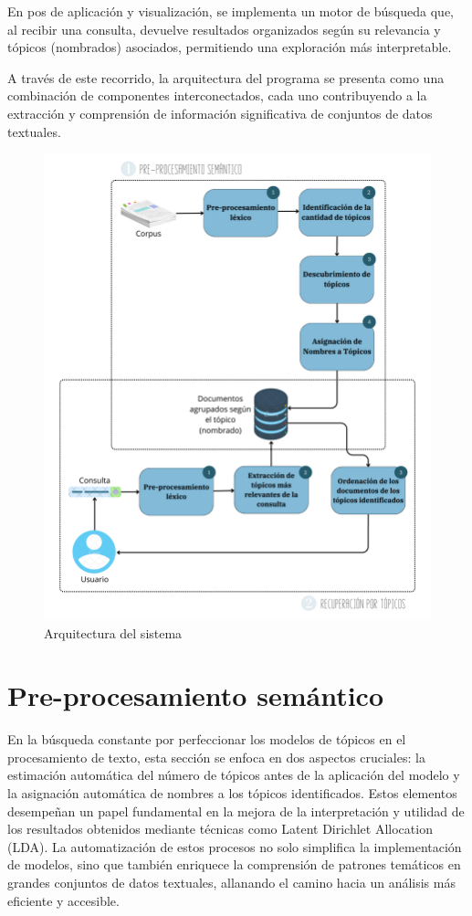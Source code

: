 En pos de aplicación y visualización, se implementa un motor de búsqueda que, al recibir una consulta, devuelve resultados organizados según su relevancia y tópicos (nombrados) asociados, permitiendo una exploración más interpretable.

A través de este recorrido, la arquitectura del programa se presenta como una combinación de componentes interconectados, cada uno contribuyendo a la extracción y comprensión de información significativa de conjuntos de datos textuales.

\begin{figure}[H]
	\centering
	\includegraphics[width=15cm]{Architecture.png}
	\caption{Arquitectura del sistema}
\end{figure}

\newpage
\section{Pre-procesamiento sem\'antico}

En la búsqueda constante por perfeccionar los modelos de tópicos en el procesamiento de texto, esta secci\'on se enfoca en dos aspectos cruciales: la estimación automática del número de tópicos antes de la aplicación del modelo y la asignación automática de nombres a los tópicos identificados. Estos elementos desempeñan un papel fundamental en la mejora de la interpretación y utilidad de los resultados obtenidos mediante técnicas como Latent Dirichlet Allocation (LDA). La automatización de estos procesos no solo simplifica la implementación de modelos, sino que también enriquece la comprensión de patrones temáticos en grandes conjuntos de datos textuales, allanando el camino hacia un análisis más eficiente y accesible.

